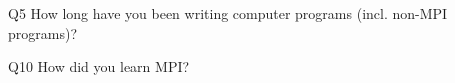 \begin{description}%
\item{Q5} How long have you been writing computer programs (incl. non-MPI programs)?%
\item{Q10} How did you learn MPI?%
\end{description}%
